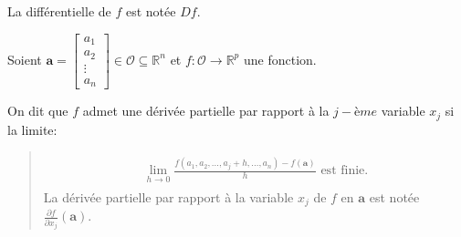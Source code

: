\documentclass[letterpaper,11pt,english]{sphinxmanual}
\begin{document}
\begin{DUlineblock}{0em}
\item[] La différentielle de \(f\) est notée \(Df\).
\item[] 
\item[] Soient
\(\mathbf{a}=\begin{bmatrix} a_1\\ a_2\\ \vdots \\ a_n \end{bmatrix}\in \mathcal{O}\subseteq{\mathbb{R}^n}\)
et \(f: \mathcal{O}\rightarrow \mathbb{R}^p\) une fonction.
\item[] On dit que \(f\) admet une dérivée partielle par rapport à la
\(j-ème\) variable \(x_j\) si la limite:
\end{DUlineblock}
\begin{quote}
\begin{equation}\label{equation:chapter2:chapter2:28}
\begin{split}\begin{aligned}
    \lim_{h\rightarrow 0}\frac{f(a_1, a_2, \dots, a_j+h, \dots, a_n)-f(\mathbf{a})}{h} \text{ est finie.}\end{aligned}\end{split}
\end{equation}
\sphinxAtStartPar
La dérivée partielle par rapport à la variable \(x_j\) de
\(f\) en \(\mathbf{a}\) est notée
\(\frac{\partial f}{\partial x_j}(\mathbf{a})\).
\end{quote}
\end{document}
